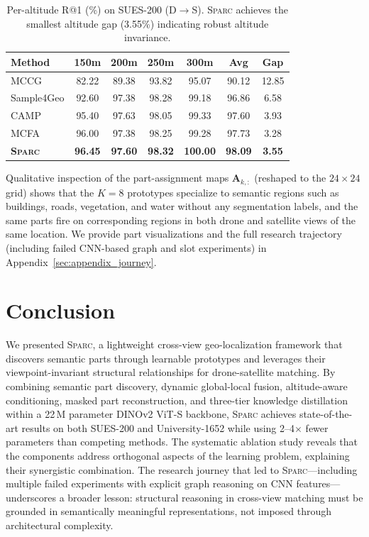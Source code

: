 \documentclass[sigconf, anonymous, review]{acmart}
\newcommand{\ours}{\textsc{Sparc}}
\begin{document}
\begin{table}[t]
\caption{Per-altitude R@1 (\%) on SUES-200 (D$\to$S). \ours{} achieves the smallest altitude gap (3.55\%) indicating robust altitude invariance.}
\label{tab:per_alt}
\centering
\small
\begin{tabular}{@{}lcccccc@{}}
\toprule
\textbf{Method} & \textbf{150m} & \textbf{200m} & \textbf{250m} & \textbf{300m} & \textbf{Avg} & \textbf{Gap} \\
\midrule
MCCG & 82.22 & 89.38 & 93.82 & 95.07 & 90.12 & 12.85 \\
Sample4Geo & 92.60 & 97.38 & 98.28 & 99.18 & 96.86 & 6.58 \\
CAMP & 95.40 & 97.63 & 98.05 & 99.33 & 97.60 & 3.93 \\
MCFA & 96.00 & 97.38 & 98.25 & 99.28 & 97.73 & 3.28 \\
\midrule
\rowcolor{bestrow}
\textbf{\ours{}} & \textbf{96.45} & \textbf{97.60} & \textbf{98.32} & \textbf{100.00} & \textbf{98.09} & \textbf{3.55} \\
\bottomrule
\end{tabular}
\end{table}

Qualitative inspection of the part-assignment maps $\mathbf{A}_{k,:}$ (reshaped to the $24{\times}24$ grid) shows that the $K{=}8$ prototypes specialize to semantic regions such as buildings, roads, vegetation, and water without any segmentation labels, and the same parts fire on corresponding regions in both drone and satellite views of the same location.
We provide part visualizations and the full research trajectory (including failed CNN-based graph and slot experiments) in Appendix~\ref{sec:appendix_journey}.

\section{Conclusion}
\label{sec:conclusion}

We presented \ours{}, a lightweight cross-view geo-localization framework that discovers semantic parts through learnable prototypes and leverages their viewpoint-invariant structural relationships for drone-satellite matching.
By combining semantic part discovery, dynamic global-local fusion, altitude-aware conditioning, masked part reconstruction, and three-tier knowledge distillation within a 22\,M parameter DINOv2 ViT-S backbone, \ours{} achieves state-of-the-art results on both SUES-200 and University-1652 while using 2--4$\times$ fewer parameters than competing methods.
The systematic ablation study reveals that the components address orthogonal aspects of the learning problem, explaining their synergistic combination.
The research journey that led to \ours{}---including multiple failed experiments with explicit graph reasoning on CNN features---underscores a broader lesson: structural reasoning in cross-view matching must be grounded in semantically meaningful representations, not imposed through architectural complexity.
\end{document}
